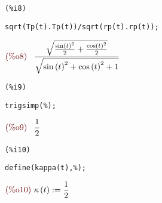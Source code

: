 \documentclass[12pt]{article}
\begin{document}
\noindent
\begin{minipage}[t]{8ex}{\color{red}\bf
\begin{verbatim}
(%i8) 
\end{verbatim}}
\end{minipage}
\begin{minipage}[t]{\textwidth}{\color{blue}
\begin{verbatim}
sqrt(Tp(t).Tp(t))/sqrt(rp(t).rp(t));
\end{verbatim}}
\end{minipage}
\begin{math}\displaystyle
\parbox{8ex}{\color{labelcolor}(\%o8) }
\frac{\sqrt{\frac{{\mathrm{sin}\left( t\right) }^{2}}{2}+\frac{{\mathrm{cos}\left( t\right) }^{2}}{2}}}{\sqrt{{\mathrm{sin}\left( t\right) }^{2}+{\mathrm{cos}\left( t\right) }^{2}+1}}
\end{math}


\noindent
\begin{minipage}[t]{8ex}{\color{red}\bf
\begin{verbatim}
(%i9) 
\end{verbatim}}
\end{minipage}
\begin{minipage}[t]{\textwidth}{\color{blue}
\begin{verbatim}
trigsimp(%);
\end{verbatim}}
\end{minipage}
\begin{math}\displaystyle
\parbox{8ex}{\color{labelcolor}(\%o9) }
\frac{1}{2}
\end{math}


\noindent
\begin{minipage}[t]{8ex}{\color{red}\bf
\begin{verbatim}
(%i10) 
\end{verbatim}}
\end{minipage}
\begin{minipage}[t]{\textwidth}{\color{blue}
\begin{verbatim}
define(kappa(t),%);
\end{verbatim}}
\end{minipage}
\begin{math}\displaystyle
\parbox{8ex}{\color{labelcolor}(\%o10) }
\kappa\left( t\right) :=\frac{1}{2}
\end{math}
\end{document}
